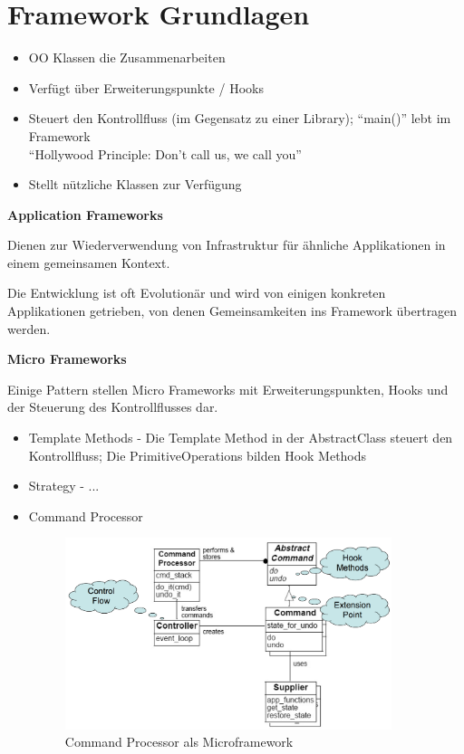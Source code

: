 \section{Framework Grundlagen}

\begin{itemize}
	\item OO Klassen die Zusammenarbeiten
	\item Verfügt über Erweiterungspunkte / Hooks
	\item Steuert den Kontrollfluss (im Gegensatz zu einer Library); ``main()'' lebt im Framework \\
		``Hollywood Principle: Don't call us, we call you''
	\item Stellt nützliche Klassen zur Verfügung
\end{itemize}

\textbf{Application Frameworks}

Dienen zur Wiederverwendung von Infrastruktur für ähnliche Applikationen in einem gemeinsamen Kontext.

Die Entwicklung ist oft Evolutionär und wird von einigen konkreten Applikationen getrieben, von denen Gemeinsamkeiten ins Framework übertragen werden.

\textbf{Micro Frameworks}

Einige Pattern stellen Micro Frameworks mit Erweiterungspunkten, Hooks und der Steuerung des Kontrollflusses dar.

\begin{itemize}
	\item Template Methods - Die Template Method in der AbstractClass steuert den Kontrollfluss; Die PrimitiveOperations bilden Hook Methods
	\item Strategy - ...
	\item Command Processor

	\begin{figure}[H]
		\centering
		\includegraphics[width=0.9\textwidth]{content/frameworks/commandprocessormicroframework.png}
		\caption{Command Processor als Microframework}
	\end{figure}
\end{itemize}